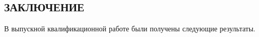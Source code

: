 \begin{center}
\section*{ЗАКЛЮЧЕНИЕ}
\end{center}
В выпускной квалификационной работе были получены следующие результаты.
